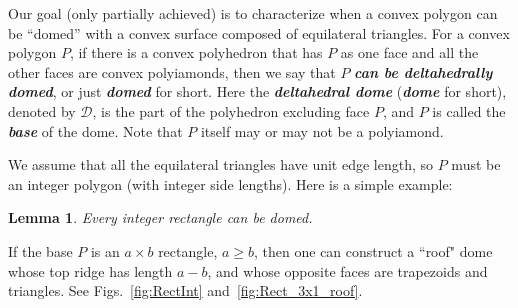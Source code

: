 \documentclass[11pt]{article}
\newcommand{\hide}[1]{}
\newcommand{\ABox}{
\raisebox{3pt}{\framebox[6pt]{\rule{6pt}{0pt}}}
}
\newenvironment{proof}{{\bf Proof:}}{\hfill\ABox\medskip}
\newtheorem{lemma}[theorem]{Lemma}
\newcommand{\lemlab}[1]{\label{lemma:#1}}
\newcommand{\figref}[1]{\ref{fig:#1}}
\def\D{{\mathcal D}}
\def\defn#1{\textit{\textbf{\boldmath #1}}}
\newcommand{\JOR}[1]{{\color{red} JOR: [#1]}}
\newcommand{\jor}[1]{{\color{cyan} #1}}
\newcommand{\Anna}[1]{{\color{red} Anna: [#1]}}
\begin{document}
Our goal (only partially achieved) 
is to characterize when a convex polygon can be ``domed'' with a convex surface composed of equilateral triangles.  
For a convex polygon $P$, 
if there is a convex polyhedron that has $P$ as one face and all the other faces are convex polyiamonds, then we say that $P$ \defn{can be deltahedrally domed}, or just \defn{domed} for short.  
Here the \defn{deltahedral dome} (\defn{dome} for short), denoted by $\D$, is the part of the polyhedron excluding face $P$, and $P$ is called the \defn{base} of the dome.  Note that $P$ itself may or may not be a polyiamond.




We assume that all the equilateral triangles have unit edge length,
so $P$ must be an integer polygon (with integer side lengths).
%
Here is a simple example:
\begin{lemma}
\lemlab{Rect}
Every integer rectangle can be domed.
\end{lemma}
%
\begin{proof}
If the base $P$ is an $a \times b$ rectangle, $a \ge b$,
then one can construct a ``roof" dome
whose top ridge has length $a-b$, and whose opposite
faces are trapezoids and triangles.
See Figs.~\figref{RectInt} and~\figref{Rect_3x1_roof}.
\end{proof}
\end{document}
